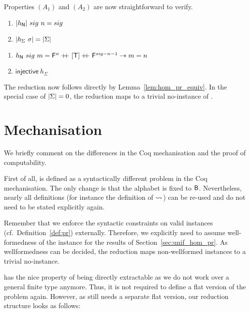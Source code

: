 Properties $(A_1)$ and $(A_2)$ are now straightforward to verify.

\begin{lemma}[Uniformity]
  \begin{enumerate}
    \item $|h_{\mathsf{N}}|~sig~n = sig$
    \item $|h_{\Sigma}~\sigma| = |\Sigma|$
  \end{enumerate}
\end{lemma}

\begin{lemma}[Injectivity]
  \begin{enumerate}
    \item $h_{\mathsf{N}}~sig~m = \mathsf{F}^n +\kern-1.3ex+\kern0.8ex [\mathsf{T}] +\kern-1.3ex+\kern0.8ex \mathsf{F}^{sig - n - 1} \rightarrow m = n$
    \item $\textsf{injective}~h_{\Sigma}$
  \end{enumerate}
\end{lemma}

The reduction now follows directly by Lemma~\ref{lem:hom_pr_equiv}.
In the special case of $|\Sigma| = 0$, the reduction maps to a trivial no-instance of \BPR{}. 

\section{Mechanisation}
We briefly comment on the differences in the Coq mechanisation and the proof of computability. 

First of all, \BPR{} is defined as a syntactically different problem in the Coq mechanisation. The only change is that the alphabet is fixed to $\textsf{B}$. Nevertheless, nearly all definitions (for instance the definition of $\rightsquigarrow_{}$) can be re-used and do not need to be stated explicitly again.

Remember that we enforce the syntactic constraints on valid \PR{} instances (cf.\ Definition~\ref{def:pr}) externally. Therefore, we explicitly need to assume well-formedness of the \PR{} instance for the results of Section~\ref{sec:unif_hom_pr}. As wellformedness can be decided, the reduction maps non-wellformed instances to a trivial no-instance.

\BPR{} has the nice property of being directly extractable as we do not work over a general finite type anymore. Thus, it is not required to define a flat version of the problem again. However, as \PR{} still needs a separate flat version, our reduction structure looks as follows:
\begin{center}
\end{center}

